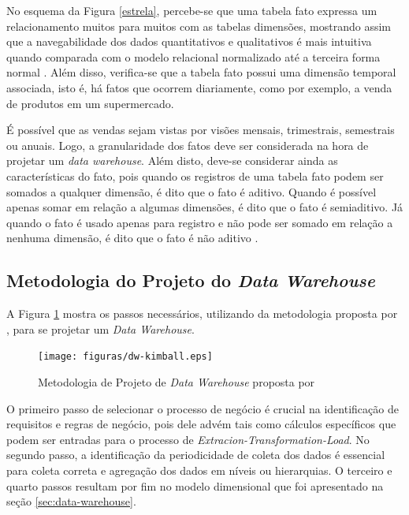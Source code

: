 No esquema da Figura \ref{estrela}, percebe-se que uma tabela fato expressa um relacionamento muitos para muitos com as tabelas dimensões, mostrando assim que a navegabilidade dos dados quantitativos e qualitativos é mais intuitiva quando comparada com o modelo relacional normalizado até a terceira forma normal \cite{Kimball2002}. Além disso, verifica-se que a tabela fato possui uma dimensão temporal associada, isto é, há fatos que ocorrem diariamente, como por exemplo, a venda de produtos em um supermercado. 

É possível que as vendas sejam vistas por visões mensais, trimestrais, semestrais ou anuais. Logo, a granularidade dos fatos deve ser considerada na hora de projetar um \textit{data warehouse}. Além disto, deve-se considerar ainda as características do fato, pois quando os registros de uma tabela fato podem ser somados a qualquer dimensão, é dito que o fato é aditivo. Quando é possível apenas somar em relação a algumas dimensões, é dito que o fato é semiaditivo. Já quando o fato é usado apenas para registro e não pode ser somado em relação a nenhuma dimensão, é dito que o fato é não aditivo \cite{Inmon1992}.

\subsection{Metodologia do Projeto do \textit{Data Warehouse}}
\label{sec:metodologia-dw}

A Figura \ref{fig:metodologia-dw} mostra os passos necessários, utilizando da metodologia proposta por , para se projetar um \textit{Data Warehouse}.

\begin{figure}[ht!]
\centering
\texttt{[image: figuras/dw-kimball.eps]}
\caption{Metodologia de Projeto de \textit{Data Warehouse} proposta por }
\label{fig:metodologia-dw}
\end{figure}
\FloatBarrier

O primeiro passo de selecionar o processo de negócio é crucial na identificação de requisitos e regras de negócio, pois dele advém tais como cálculos específicos que podem ser entradas para o processo de \textit{Extracion-Transformation-Load}. No segundo passo, a identificação da periodicidade de coleta dos dados é essencial para coleta correta e agregação dos dados em níveis ou hierarquias. O terceiro e quarto passos resultam por fim no modelo dimensional que foi apresentado na seção \ref{sec:data-warehouse}. 

